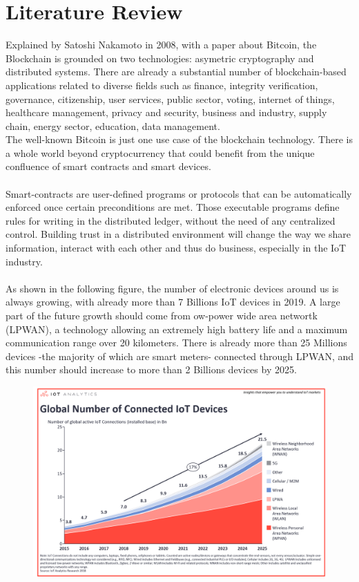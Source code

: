 \documentclass[11pt]{article}
\begin{document}
\section{Literature Review}
Explained by Satoshi Nakamoto in 2008, with a paper about Bitcoin, the Blockchain is grounded on two technologies: asymetric cryptography and distributed systems. There are already a substantial number of blockchain-based applications related to diverse fields such as finance, integrity verification, governance, citizenship, user services, public sector, voting, internet of things, healthcare management, privacy and security, business and industry, supply chain, energy sector, education, data management.\cite{1} \\
The well-known Bitcoin is just one use case of the blockchain technology. There is a whole world beyond cryptocurrency that could benefit from the unique confluence of smart contracts and smart devices.\\\\
Smart-contracts are user-defined programs or protocols that can be automatically enforced once certain preconditions are met. Those executable programs define rules for writing in the distributed ledger, without the need of any centralized control. Building trust in a distributed environment will change the way we share information, interact with each other and thus do business, especially in the IoT industry.\cite{2}\\\\
As shown in the following figure\cite{3}, the number of electronic devices around us is always growing, with already more than 7 Billions IoT devices in 2019. A large part of the future growth should come from ow-power wide area networtk (LPWAN), a technology allowing an extremely high battery life and a maximum communication range over 20 kilometers. There is already more than 25 Millions devices -the majority of which are smart meters- connected through LPWAN, and this number should increase to more than 2 Billions devices by 2025.\\
\begin{figure}[h]
	\centering
	\includegraphics[width=1\linewidth]{stateofIoT2018.png}
\end{figure}\\
\end{document}
